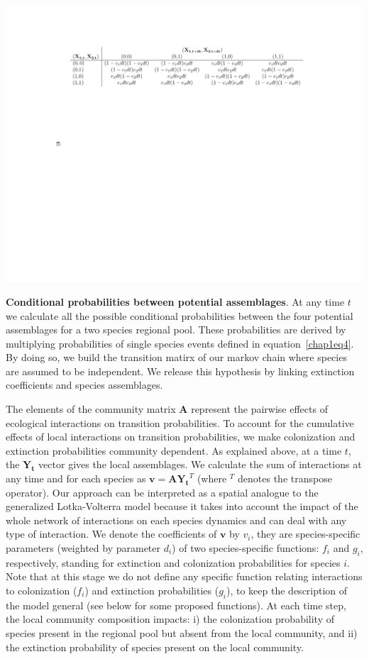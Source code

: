 \begin{table}[h!]
\centering
\includegraphics[scale=0.85]{./chapitre1/table1.pdf}
\caption[Conditional probabilities between potential assemblages]{\textbf{Conditional probabilities between potential assemblages}. At any time $t$ we calculate all the possible conditional probabilities between the four potential assemblages for a two species regional pool. These probabilities are derived by multiplying probabilities of single species events defined in equation~\eqref{chap1eq4}. By doing so, we build the transition matirx of our markov chain where species are assumed to be independent. We release this hypothesis by linking extinction coefficients and species assemblages.}
\label{tb1}
\end{table}

The elements of the community matrix $\mathbf{A}$ represent the pairwise effects of ecological interactions on transition probabilities. To account for the cumulative effects of local interactions on transition probabilities, we make colonization and extinction probabilities community dependent. As explained above, at a time $t$, the $\mathbf{Y_t}$ vector gives the local assemblages. We calculate the sum of interactions at any time and for each species as $\mathbf{v}=\mathbf{A}\mathbf{Y_t}^T$ (where $^T$ denotes the transpose operator). Our approach can be interpreted as a spatial analogue to the generalized Lotka-Volterra model because it takes into account the impact of the whole network of interactions on each species dynamics and can deal with any type of interaction. We denote the coefficients of $\mathbf{v}$ by $v_i$, they are species-specific parameters (weighted by parameter $d_i$) of two species-specific functions: $f_i$ and $g_i$, respectively, standing for extinction and colonization probabilities for species $i$. Note that at this stage we do not define any specific function relating interactions to colonization ($f_i$) and extinction probabilities ($g_i$), to keep the description of the model general (see below for some proposed functions). At each time step, the local community composition impacts: i) the colonization probability of species present in the regional pool but absent from the local community, and ii) the extinction probability of species present on the local community.

